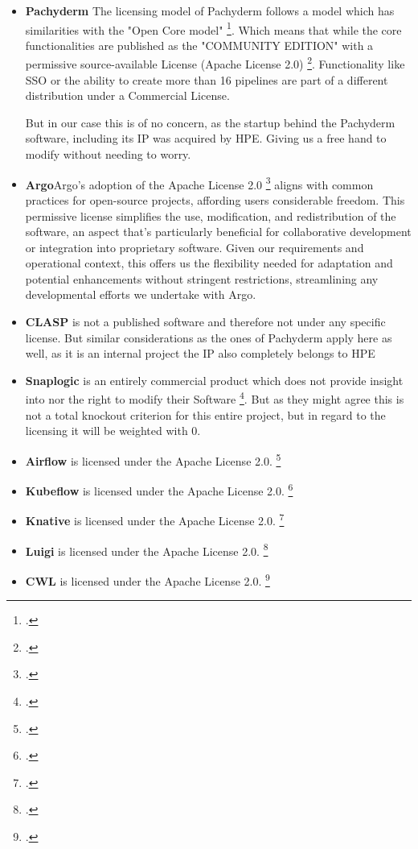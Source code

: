\begin{itemize}
    \item \textbf{Pachyderm} 
    The licensing model of Pachyderm follows a model which has similarities with the "Open Core model" \footcite{PahcydermPricing2022}.
    Which means that while the core functionalities are published as the "COMMUNITY EDITION" with a permissive source-available License (Apache License 2.0) \footcite{PachydermLICENSEMaster}.
    Functionality like \ac{SSO} or the ability to create more than 16 pipelines are part of a different distribution under a Commercial License.

    But in our case this is of no concern, as the startup behind the Pachyderm software, including its \ac{IP} was acquired by \ac{HPE}.
    Giving us a free hand to modify without needing to worry.

    \item \textbf{Argo}Argo's adoption of the Apache License 2.0 \footcite{ArgocdLICENSEMaster} aligns with common practices for open-source projects, affording users considerable freedom. This permissive license simplifies the use, modification, and redistribution of the software, an aspect that's particularly beneficial for collaborative development or integration into proprietary software. Given our requirements and operational context, this offers us the flexibility needed for adaptation and potential enhancements without stringent restrictions, streamlining any developmental efforts we undertake with Argo.
    \item \textbf{\ac{CLASP}} is not a published software and therefore not under any specific license.
    But similar considerations as the ones of Pachyderm apply here as well, as it is an internal project the \ac{IP} also completely belongs to \ac{HPE}

    \item \textbf{Snaplogic} is an entirely commercial product which does not provide insight into nor the right to modify their Software \footcite{SnapLogicMasterSubscription}.
    But as they might agree this is not a total knockout criterion for this entire project, but in regard to the licensing it will be weighted with 0.
    \item \textbf{Airflow} is licensed under the Apache License 2.0. \footcite{LicenseAirflowDocumentation}
    \item \textbf{Kubeflow} is licensed under the Apache License 2.0. \footcite{KubeflowLICENSEMaster}
    \item \textbf{Knative} is licensed under the Apache License 2.0. \footcite{KnativeDocsLICENSE}
    \item \textbf{Luigi} is licensed under the Apache License 2.0. \footcite{LuigiLICENSEMaster}
    \item \textbf{CWL} is licensed under the Apache License 2.0. \footcite{CwlutilsLICENSEMain}
    
\end{itemize}

